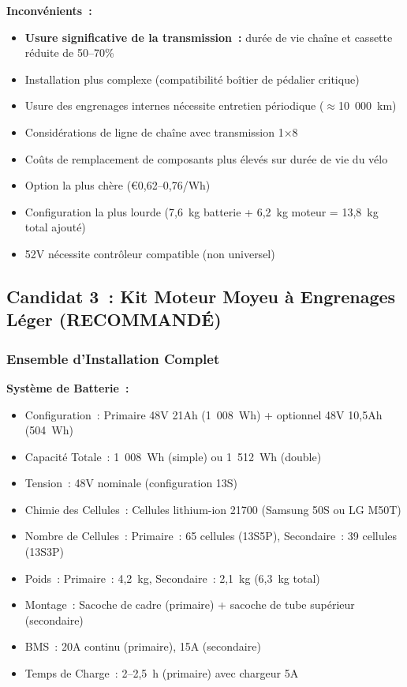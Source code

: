 \documentclass[12pt,a4paper]{article}
\begin{document}
\textbf{Inconvénients~:}
\begin{itemize}
    \item \textbf{Usure significative de la transmission~:} durée de vie chaîne et cassette réduite de 50--70\%
    \item Installation plus complexe (compatibilité boîtier de pédalier critique)
    \item Usure des engrenages internes nécessite entretien périodique ($\approx$10~000~km)
    \item Considérations de ligne de chaîne avec transmission 1×8
    \item Coûts de remplacement de composants plus élevés sur durée de vie du vélo
    \item Option la plus chère (€0,62--0,76/Wh)
    \item Configuration la plus lourde (7,6~kg batterie + 6,2~kg moteur = 13,8~kg total ajouté)
    \item 52V nécessite contrôleur compatible (non universel)
\end{itemize}

\subsection{Candidat 3~: Kit Moteur Moyeu à Engrenages Léger (\textbf{RECOMMANDÉ})}

\subsubsection{Ensemble d'Installation Complet}

\textbf{Système de Batterie~:}
\begin{itemize}
    \item Configuration~: Primaire 48V 21Ah (1~008~Wh) + optionnel 48V 10,5Ah (504~Wh)
    \item Capacité Totale~: 1~008~Wh (simple) ou 1~512~Wh (double)
    \item Tension~: 48V nominale (configuration 13S)
    \item Chimie des Cellules~: Cellules lithium-ion 21700 (Samsung 50S ou LG M50T) \cite{samsung-50s, lg-m50t}
    \item Nombre de Cellules~: Primaire~: 65 cellules (13S5P), Secondaire~: 39 cellules (13S3P)
    \item Poids~: Primaire~: 4,2~kg, Secondaire~: 2,1~kg (6,3~kg total)
    \item Montage~: Sacoche de cadre (primaire) + sacoche de tube supérieur (secondaire)
    \item BMS~: 20A continu (primaire), 15A (secondaire)
    \item Temps de Charge~: 2--2,5~h (primaire) avec chargeur 5A
\end{itemize}
\end{document}
